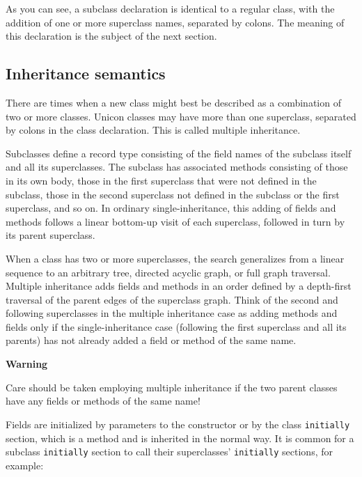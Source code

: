 As you can see, a subclass declaration is identical to a regular class,
with the addition of one or more superclass names, separated by colons.
The meaning of this declaration is the subject of the next section. 

\subsection{Inheritance semantics}

There are times when a new class might best
be described as a combination of two or more classes. Unicon classes
may have more than one superclass, separated by colons in the class
declaration. This is called multiple inheritance.

Subclasses define a record type consisting of the field names of the
subclass itself and all its superclasses. The subclass has associated
methods consisting of those in its own body, those in the first
superclass that were not defined in the subclass, those in the second
superclass not defined in the subclass or the first superclass, and so
on. In ordinary single-inheritance, this adding of fields and methods
follows a linear bottom-up visit of each superclass,
followed in turn by its parent superclass. 

When a class has two or more superclasses, the search generalizes from a
linear sequence to an arbitrary tree, directed acyclic
graph, or full graph traversal. 
Multiple inheritance adds fields and
methods in an order defined by a depth-first traversal of the parent
edges of the superclass graph. Think of the second and following
superclasses in the
multiple inheritance case as adding methods and fields only if the
single-inheritance case (following the first superclass and all its
parents) has not already added a field or method of the same name. 

{\sffamily\bfseries
Warning}

{\sffamily
Care should be taken employing multiple inheritance if the two parent
classes have any fields or methods of the same name! }

Fields are initialized by parameters to the constructor or by the
class \texttt{initially} section, which is a method and is
inherited in the normal way. It is common for a subclass \texttt{initially}
section to call their superclasses'
\texttt{initially} sections, for example:


